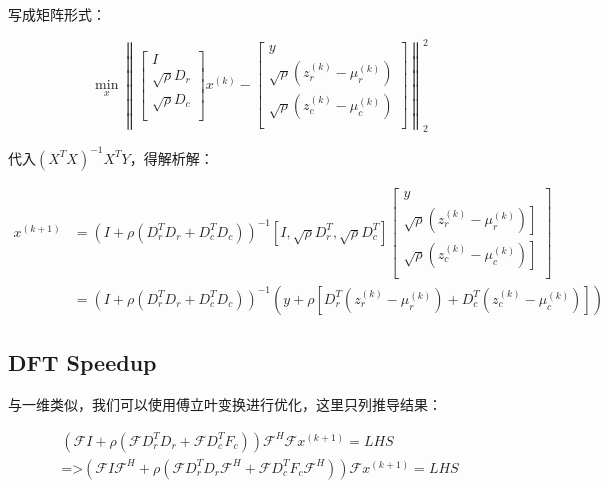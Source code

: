 \documentclass[10pt]{report}
\begin{document}
写成矩阵形式：

\begin{equation}
\min _{x}\left\|\left[\begin{array}{c} 
I \\
\sqrt{\rho} D_r \\
\sqrt{\rho} D_c \\
\end{array}\right] x^{(k)} -\left[\begin{array}{c} 
y \\
\sqrt{\rho}\left( z_r ^{(k)}- \mu_r ^{(k)}\right) \\
\sqrt{\rho}\left( z_c ^{(k)}- \mu_c ^{(k)}\right) \\
\end{array}\right]\right\|_{2}^{2}
\end{equation}

代入$(X^TX)^{-1}X^TY$，得解析解：

\begin{equation}
\begin{aligned}
x ^{(k+1)} &=\left( I +\rho (D_r^TD_r + D_c^TD_c) \right)^{-1}\left[ I, \sqrt{\rho} D_r^T, \sqrt{\rho} D_c^T \right]\left[\begin{array}{c} 
y \\
\left.\sqrt{\rho}\left( z_r ^{(k)}- \mu_r ^{(k)}\right)\right] \\
\left.\sqrt{\rho}\left( z_c ^{(k)}- \mu_c ^{(k)}\right)\right] \\
\end{array}\right] \\
&=\left( I +\rho (D_r^TD_r + D_c^TD_c) \right)^{-1} \left( y + \rho \left[ D_r^T\left( z_r ^{(k)}- \mu_r ^{(k)}\right) + D_c^T\left( z_c ^{(k)}- \mu_c ^{(k)}\right) \right] \right)
\end{aligned}
\end{equation}

\subsection{DFT Speedup}

与一维类似，我们可以使用傅立叶变换进行优化，这里只列推导结果：

\begin{equation}
\begin{aligned}
\left( \mathcal{F}I +\rho (\mathcal{F}D_r^TD_r + \mathcal{F}D_c^TF_c) \right) \mathcal{F}^H\mathcal{F} x ^{(k+1)} = LHS \\
\text{=>} 
\left( \mathcal{F}I\mathcal{F}^H +\rho (\mathcal{F}D_r^TD_r\mathcal{F}^H + \mathcal{F}D_c^TF_c\mathcal{F}^H) \right) \mathcal{F} x ^{(k+1)} = LHS	
\end{aligned}
\end{equation}
\end{document}
